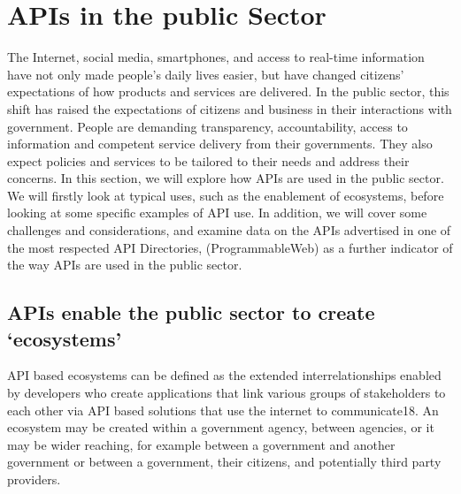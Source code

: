 
\chapter{APIs in the public Sector}

\ifpdf
    \graphicspath{{Chapter2/Figs/Raster/}{Chapter2/Figs/PDF/}{Chapter2/Figs/}}
\else
    \graphicspath{{Chapter2/Figs/Vector/}{Chapter2/Figs/}}
\fi

The Internet, social media, smartphones, and access to real-time information have not only made people’s
daily lives easier, but have changed citizens’ expectations of how products and services are delivered. In
the public sector, this shift has raised the expectations of citizens and business in their interactions with
government.
People are demanding transparency, accountability, access to information and competent service delivery
from their governments. They also expect policies and services to be tailored to their needs and address
their concerns.
In this section, we will explore how APIs are used in the public sector. We will firstly look at typical uses,
such as the enablement of ecosystems, before looking at some specific examples of API use. In addition,
we will cover some challenges and considerations, and examine data on the APIs advertised in one of the
most respected API Directories, (ProgrammableWeb) as a further indicator of the way APIs are used in the
public sector.


\section{APIs enable the public sector to create ‘ecosystems’}

API based ecosystems can be defined as the extended interrelationships enabled by developers who
create applications that link various groups of stakeholders to each other via API based solutions that use
the internet to communicate18.
An ecosystem may be created within a government agency, between agencies, or it may be wider reaching,
for example between a government and another government or between a government, their citizens, and
potentially third party providers.

